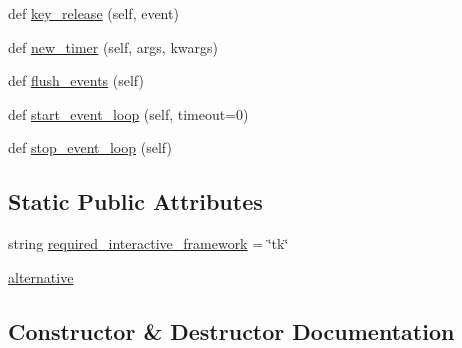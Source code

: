 \begin{DoxyCompactItemize}
\item 
def \hyperlink{classmatplotlib_1_1backends_1_1__backend__tk_1_1FigureCanvasTk_af2386c1f6a3725d5d358cb3ffff6f4be}{key\+\_\+release} (self, event)
\item 
def \hyperlink{classmatplotlib_1_1backends_1_1__backend__tk_1_1FigureCanvasTk_aa0f36b35fa92dfaa92519a6d8c1cd2d1}{new\+\_\+timer} (self, args, kwargs)
\item 
def \hyperlink{classmatplotlib_1_1backends_1_1__backend__tk_1_1FigureCanvasTk_a96a385a1d7d88c3d7a8b02ce4770b184}{flush\+\_\+events} (self)
\item 
def \hyperlink{classmatplotlib_1_1backends_1_1__backend__tk_1_1FigureCanvasTk_a24b4d9e6ea078d663503ac90bce0b332}{start\+\_\+event\+\_\+loop} (self, timeout=0)
\item 
def \hyperlink{classmatplotlib_1_1backends_1_1__backend__tk_1_1FigureCanvasTk_abed13c59a94dce3bc710e46ff0bc54fd}{stop\+\_\+event\+\_\+loop} (self)
\end{DoxyCompactItemize}
\subsection*{Static Public Attributes}
\begin{DoxyCompactItemize}
\item 
string \hyperlink{classmatplotlib_1_1backends_1_1__backend__tk_1_1FigureCanvasTk_a43164581caeaeb2d38ec9c7da69207d2}{required\+\_\+interactive\+\_\+framework} = \char`\"{}tk\char`\"{}
\item 
\hyperlink{classmatplotlib_1_1backends_1_1__backend__tk_1_1FigureCanvasTk_a5ccf1ead7f95d3e2dde173428009cd5d}{alternative}
\end{DoxyCompactItemize}


\subsection{Constructor \& Destructor Documentation}
\mbox{\label{classmatplotlib_1_1backends_1_1__backend__tk_1_1FigureCanvasTk_ae2cd85a7d008ea96b789adccf6c6a709}} 
